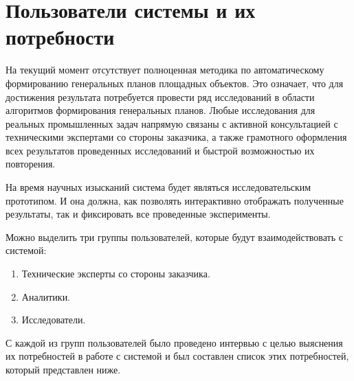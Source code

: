 \section{\Large{Пользователи системы и их потребности}}

На текущий момент отсутствует полноценная методика
по автоматическому формированию генеральных планов площадных объектов.
Это означает, что для достижения результата потребуется провести ряд исследований в области алгоритмов
формирования генеральных планов.
Любые исследования для реальных промышленных задач напрямую связаны с активной консультацией с техническими
экспертами со стороны заказчика, а также грамотного оформления всех результатов проведенных исследований
и быстрой возможностью их повторения.

На время научных изысканий система будет являться исследовательским прототипом.
И она должна, как позволять интерактивно отображать полученные результаты,
так и фиксировать все проведенные эксперименты.


Можно выделить три группы пользователей, которые будут взаимодействовать с системой:
\begin{enumerate}
    \item Технические эксперты со стороны заказчика.
    \item Аналитики.
    \item Исследователи.
\end{enumerate}

С каждой из групп пользователей было проведено интервью с целью выяснения их потребностей в работе с системой
и был составлен список этих потребностей, который представлен ниже.

